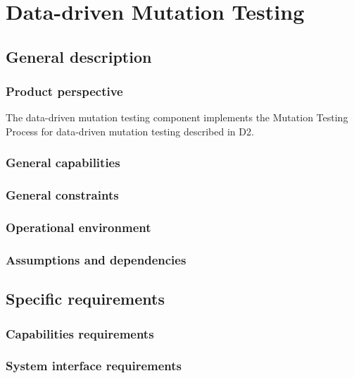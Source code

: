 


\chapter{Data-driven Mutation Testing}
\label{chapter:dataDriven}

\section{General description}




\subsection{Product perspective}
\RQ{} The data-driven mutation testing component implements the Mutation Testing Process for data-driven mutation testing described in D2.
\clearpage
\subsection{General capabilities}

\clearpage
\subsection{General constraints}
\subsection{Operational environment}
\subsection{Assumptions and dependencies}
\section{Specific requirements}
\subsection{Capabilities requirements}
\subsection{System interface requirements}
